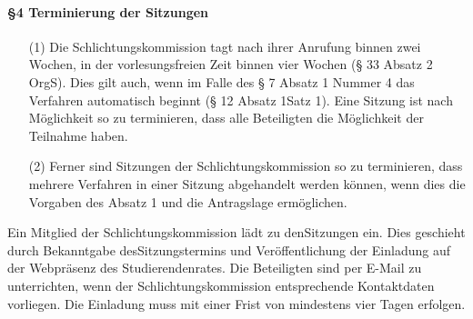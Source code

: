         \paragraph{§4 Terminierung der Sitzungen}
            \begin{itemize}
                \item[(1)] Die Schlichtungskommission tagt nach ihrer Anrufung binnen zwei Wochen, in der vorlesungsfreien Zeit binnen vier Wochen (§ 33 Absatz 2 OrgS). Dies gilt auch, wenn im Falle des § 7 Absatz 1 Nummer 4 das Verfahren automatisch beginnt (§ 12 Absatz 1Satz 1). Eine Sitzung ist nach Möglichkeit so zu terminieren, dass alle Beteiligten die Möglichkeit der Teilnahme haben.
                \item[(2)] Ferner sind Sitzungen der Schlichtungskommission    so    zu    terminieren,    dass mehrere   Verfahren   in   einer   Sitzung   abgehandelt werden können, wenn dies die Vorgaben des Absatz 1 und die Antragslage ermöglichen. 
            \end{itemize}
            Ein Mitglied der Schlichtungskommission lädt zu denSitzungen ein. Dies geschieht durch Bekanntgabe desSitzungstermins und Veröffentlichung der Einladung auf der Webpräsenz des Studierendenrates. Die Beteiligten sind per E-Mail zu unterrichten, wenn der Schlichtungskommission entsprechende Kontaktdaten vorliegen. Die Einladung muss mit einer Frist von mindestens vier Tagen erfolgen.
